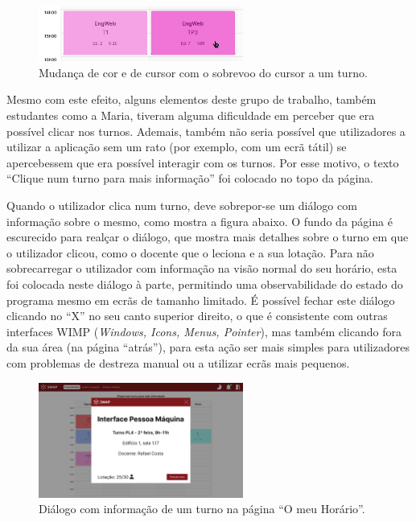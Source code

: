 \documentclass[12pt, a4paper]{article}
\begin{document}
\begin{figure}[H]
    \centering
    \includegraphics[width=0.6\textwidth]{res/prototype/turno-hover.png}
    \caption{Mudança de cor e de cursor com o sobrevoo do cursor a um turno.}
    \label{turno-hover}
\end{figure}

Mesmo com este efeito, alguns elementos deste grupo de trabalho, também estudantes como a Maria,
tiveram alguma dificuldade em perceber que era possível clicar nos turnos. Ademais, também não
seria possível que utilizadores a utilizar a aplicação sem um rato (por exemplo, com um ecrã tátil)
se apercebessem que era possível interagir com os turnos. Por esse motivo, o texto ``Clique num
turno para mais informação'' foi colocado no topo da página.

Quando o utilizador clica num turno, deve sobrepor-se um diálogo com informação sobre o mesmo, como
mostra a figura abaixo. O fundo da página é escurecido para realçar o diálogo, que mostra mais
detalhes sobre o turno em que o utilizador clicou, como o docente que o leciona e a sua lotação.
Para não sobrecarregar o utilizador com informação na visão normal do seu horário, esta foi colocada
neste diálogo à parte, permitindo uma observabilidade do estado do programa mesmo em ecrãs de
tamanho limitado. É possível fechar este diálogo clicando no ``X'' no seu canto superior direito, o
que é consistente com outras interfaces WIMP (\emph{Windows, Icons, Menus, Pointer}), mas também
clicando fora da sua área (na página ``atrás''), para esta ação ser mais simples para utilizadores
com problemas de destreza manual ou a utilizar ecrãs mais pequenos.

\begin{figure}[H]
    \centering
    \includegraphics[width=0.6\textwidth]{res/prototype/dialogo-informacao-turno.png}
    \caption{Diálogo com informação de um turno na página ``O meu Horário''.}
    \label{dialogo-informacao-turno}
\end{figure}
\end{document}
